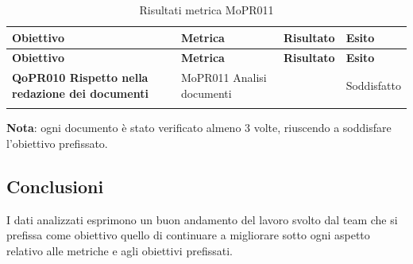 \documentclass[../piano-di-qualifica.tex]{subfiles}
\begin{document}
\renewcommand{\arraystretch}{2} %
\begin{longtable}[H]{>{\centering\bfseries}m{5cm} >{\centering}m{5cm} >{\centering}m{2.5cm} >{\centering\arraybackslash}m{2.5cm}}  
  \rowcolor{lightgray}
  {\textbf{Obiettivo}} & {\textbf{Metrica}} & {\textbf{Risultato}} & {\textbf{Esito}}  \\
  \endfirsthead%
  \rowcolor{lightgray}
  {\textbf{Obiettivo}} & {\textbf{Metrica}} & {\textbf{Risultato}} & {\textbf{Esito}}  \\
  \endhead%
  \textbf{QoPR010 Rispetto nella redazione dei documenti} & MoPR011 Analisi documenti & 3 & Soddisfatto \\
  \caption{Risultati metrica MoPR011}
  \label{tab:my-table}
\end{longtable}
\textbf{Nota}: ogni documento è stato verificato almeno 3 volte, riuscendo a soddisfare l'obiettivo prefissato.

\subsection{Conclusioni}%
\label{sub:conclusioni}
I dati analizzati esprimono un buon andamento del lavoro svolto dal team che si prefissa come obiettivo quello di continuare a migliorare sotto ogni aspetto relativo alle metriche e agli obiettivi prefissati.
\end{document}
